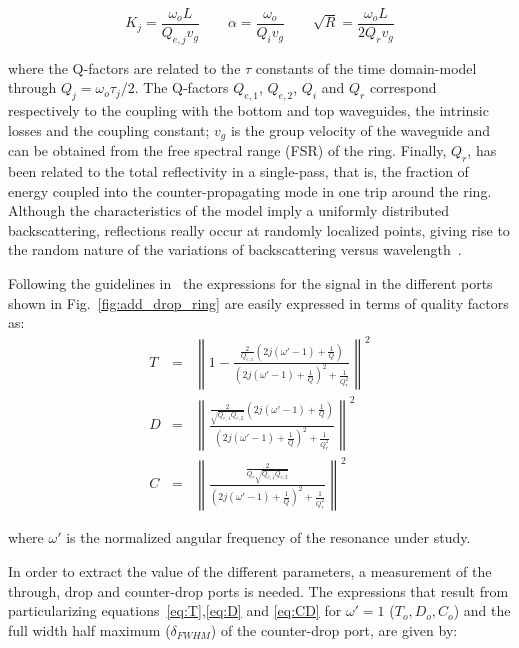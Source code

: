 \documentclass[10pt,letterpaper]{article}
\begin{document}
\begin{equation}
    K_j=\frac{\omega_oL}{Q_{e,j} v_g}  \qquad \alpha=\frac{\omega_o}{Q_i v_g} \qquad \sqrt{R}=\frac{\omega_oL}{2Q_rv_g}
\label{eq:space-constants}
\end{equation}

where the Q-factors are related to the $\tau$ constants of the time domain-model through $Q_j=\omega_o \tau_j/2$. The Q-factors $Q_{e,1}$, $Q_{e,2}$, $Q_{i}$ and $Q_{r}$ correspond respectively to the coupling with the bottom and top waveguides, the intrinsic losses and the coupling constant; $v_g$ is the group velocity of the waveguide and can be obtained from the free spectral range (FSR) of the ring. Finally, $Q_r$, has been related to the total reflectivity in a single-pass, that is, the fraction of energy coupled into the counter-propagating mode in one trip around the ring. Although the characteristics of the model imply a uniformly distributed backscattering, reflections really occur at randomly localized points, giving rise to the random nature of the variations of backscattering versus wavelength~\cite{Morichetti2010}.

Following the guidelines in~\cite{Haus1984,Little1997,Zhang2008} the expressions for the signal in the different ports shown in Fig.~\ref{fig:add_drop_ring} are easily expressed in terms of quality factors as:
\begin{eqnarray}
	T&=& \left\lVert1-\frac{        \frac{2}{Q_{e,1}}(2j(\omega '-1)+\frac{1}{Q})   }  {   (2j(\omega '-1)+\frac{1}{Q})^2+\frac{1}{Q_r^2}  }\right\rVert^2 \label{eq:T} \\
	D &=& \left\lVert\frac{          \frac{2}{\sqrt{Q_{e,1}Q_{e,2}}}(2j(\omega '-1)+\frac{1}{Q})   }  {   (2j(\omega'-1)+\frac{1}{Q})^2+\frac{1}{Q_r^2}    }\right\rVert^2 \label{eq:D} \\
	C&=& \left\lVert\frac{          \frac{2}{Q_r\sqrt{Q_{e,1}Q_{e,2}}}   }  {   (2j(\omega'-1)+\frac{1}{Q})^2+\frac{1}{Q_r^2}    }\right\rVert^2 \label{eq:CD}
\end{eqnarray}

where $\omega'$ is the normalized angular frequency of the resonance under study.

In order to extract the value of the different parameters, a measurement of the through, drop and counter-drop ports is needed. The expressions that result from particularizing equations~\ref{eq:T},\ref{eq:D} and \ref{eq:CD} for $\omega'=1$  ($T_o,D_o,C_o$) and the full width half maximum ($\delta_{FWHM}$) of the counter-drop port, are given by:
\end{document}
